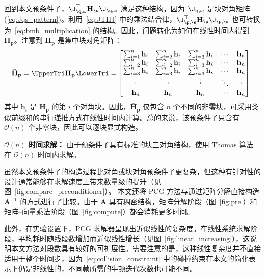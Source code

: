 回到本文预条件子，$\J_{\q,\omega}^\top \mathbf{H}_\q \J_{\q, \omega}$ 满足这种结构，因为 $\J_{\mathbf{q, \omega}}$ 是块对角矩阵 (\cref{eq:Jqs_pattern})。利用~\cref{eq:JTHJ} 中的乘法结合律，$\J_{\p,\s}^\top \mathbf{H}_\p \J_{\p, \s}$ 也可转换为~\cref{eq:bmb_multiplication} 的结构。因此，问题转化为如何在线性时间内得到 $\bar{\mathbf{H}}_{\mathbf{p}}$。注意到 $\mathbf{H}_{\mathbf{p}}$ 是集中块对角矩阵：
\begin{equation}
  \bar{\mathbf{H}}_{\mathbf{p}} = \UpperTri \mathbf{H}_{\mathbf{p}} \LowerTri =
  \begin{bmatrix}
    \sum_{i=1}^{n} \mathbf{h}_{i} & \sum_{i=2}^{n} \mathbf{h}_{i} & \sum_{i=3}^{n} \mathbf{h}_{i} & \cdots & \mathbf{h}_{n} \\
    \sum_{i=2}^{n} \mathbf{h}_{i} & \sum_{i=2}^{n} \mathbf{h}_{i} & \sum_{i=3}^{n} \mathbf{h}_{i} & \cdots & \mathbf{h}_{n} \\
    \sum_{i=3}^{n} \mathbf{h}_{i} & \sum_{i=3}^{n} \mathbf{h}_{i} & \sum_{i=3}^{n} \mathbf{h}_{i} & \cdots & \mathbf{h}_{n} \\
    \vdots                        & \vdots                        & \vdots                        & \ddots & \vdots         \\
    \mathbf{h}_{n}                & \mathbf{h}_{n}                & \mathbf{h}_{n}                & \cdots & \mathbf{h}_{n} \\
  \end{bmatrix}.
\end{equation}
其中 $\mathbf{h}_{i}$ 是 $\mathbf{H}_{\mathbf{p}}$ 的第 $i$ 个对角块。因此，$\bar{\mathbf{H}}_{\mathbf{p}}$ 仅包含 $n$ 个不同的非零块，可采用类似前缀和的串行递推方式在线性时间内计算。总的来说，该预条件子只含有 $\mathcal{O}(n)$ 个非零块，因此可以逐块显式构造。

\textbf{$\mathcal{O}(n)$ 时间求解：} 由于预条件子具有标准的块三对角结构，使用 Thomas 算法~\cite{thomas1949elliptic} 在 $\mathcal{O}(n)$ 时间内求解。

虽然本文预条件子的构造过程比对角或块对角预条件子更复杂，但这种有针对性的设计通常能够在求解速度上带来数量级的提升（见图~\ref{fig:compare_preconditioner}）。
本文还将 PCG 方法与通过矩阵分解直接构造 $\mathbf A^{-1}$ 的方式进行了比较。由于 $\mathbf A$ 具有稠密结构，矩阵分解阶段（图~\ref{fig:pre}）和矩阵--向量乘法阶段（图~\ref{fig:compute}）都会消耗更多时间。

{\color{black}
此外，在实验设置下，PCG 求解器呈现出近似线性的复杂度。在线性系统求解阶段，平均耗时随线段数增加而近似线性增长（见图~\ref{fig:linear_increasing}），这说明本文方法对段数具有较好的可扩展性。需要注意的是，这种线性复杂度并不直接适用于整个时间步，因为~\cref{eq:collision_constraint} 中的碰撞约束在本文的简化表示下仍是非线性的，不同帧所需的牛顿迭代次数也可能不同。
}

